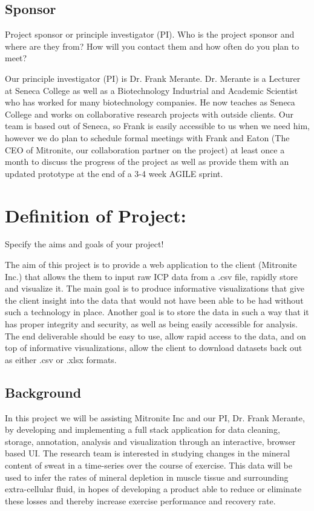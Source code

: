 \documentclass[10pt,twocolumn,letterpaper]{article}
\begin{document}
        \subsection{Sponsor}

        Project sponsor or principle investigator (PI).
	Who is the project sponsor and where are they from? 
	How will you contact them and how often do you plan to meet?

	Our principle investigator (PI) is Dr. Frank Merante. 
	Dr. Merante is a Lecturer at Seneca College as well as a Biotechnology Industrial and Academic Scientist who has worked for many biotechnology companies.
	He now teaches as Seneca College and works on collaborative research projects with outside clients. 
	Our team is based out of Seneca, so Frank is easily accessible to us when we need him, however we do plan to schedule formal meetings with Frank and Eaton (The CEO of
	Mitronite, our collaboration partner on the project) at least once a month to discuss the progress of the project as well as provide them with an updated prototype at the
	end of a 3-4 week AGILE sprint.
		
\section{Definition of Project:}

        Specify the aims and goals of your project!
		
		The aim of this project is to provide a web application to the client (Mitronite Inc.) that allows the them to input raw ICP data from a .csv file, rapidly store and 
		visualize it. 
		The main goal is to produce informative visualizations that give the client insight into the data that would not have been able to be had without such a technology in 
		place.
		Another goal is to store the data in such a way that it has proper integrity and security, as well as being easily accessible for analysis.
		The end deliverable should be easy to use, allow rapid access to the data, and on top of informative visualizations, allow the client to download datasets back out as 
		either .csv or .xlsx formats.
		
            \subsection{Background}

            In this project we will be assisting Mitronite Inc and our PI, Dr. Frank Merante, by developing and implementing a full stack application for data cleaning, storage, 
	    annotation, analysis and visualization through an interactive, browser based UI. 
	    The research team is interested in studying changes in the mineral content of sweat in a time-series over the course of exercise. This data will be used to infer the 
	    rates of mineral depletion in muscle tissue and surrounding extra-cellular fluid, in hopes of developing a product able to reduce or eliminate these losses and 
	    thereby increase exercise performance and recovery rate.
\end{document}
